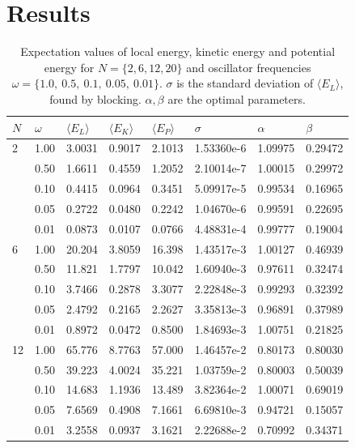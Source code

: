 \documentclass[english, a4paper]{article}
\newcommand\bk[1]{\langle#1\rangle}
\begin{document}
	
	
	
	\section{Results}
	
		\begin{table}[H]
			\begin{center}
				\caption{Expectation values of local energy, kinetic energy and potential energy for $N=\{2,6,12,20\}$ and oscillator frequencies $\omega = \{1.0,\:0.5,\:0.1,\:0.05,\:0.01\}$. $\sigma$ is the standard deviation of $\langle E_L\rangle$, found by blocking. $\alpha,\beta$ are the optimal parameters.}
				\begin{tabularx}{\textwidth}{@{}YYYYYYYY@{}}
					$N$	& $\omega$ & $\bk{E_L}$ & $\bk{E_K}$ & $\bk{E_P}$ & $\sigma$ & $\alpha$ & $\beta$\\
						&	1.00 & 3.0031 & 0.9017 & 2.1013 & 1.53360e-6 & 1.09975 & 0.29472 \\
					&	0.50 & 1.6611 & 0.4559 & 1.2052 & 2.10014e-7 & 1.00015 & 0.29972 \\
					&	0.10 & 0.4415 & 0.0964 & 0.3451 & 5.09917e-5 & 0.99534 & 0.16965 \\
					&	0.05 & 0.2722 & 0.0480 & 0.2242 & 1.04670e-6 & 0.99591 & 0.22695 \\
					&   0.01 & 0.0873 & 0.0107 & 0.0766 & 4.48831e-4 & 0.99777 & 0.19004 \\
					   &	1.00 & 20.204 & 3.8059 & 16.398 & 1.43517e-3 & 1.00127 & 0.46939 \\
					&	0.50 & 11.821 & 1.7797 & 10.042 & 1.60940e-3 & 0.97611 & 0.32474 \\
					&	0.10 & 3.7466 & 0.2878 & 3.3077 & 2.22848e-3 & 0.99293 & 0.32392 \\
					&	0.05 & 2.4792 & 0.2165 & 2.2627 & 3.35813e-3 & 0.96891 & 0.37989 \\
					&   0.01 & 0.8972 & 0.0472 & 0.8500 & 1.84693e-3 & 1.00751 & 0.21825 \\
					  &	1.00 & 65.776 & 8.7763 & 57.000 & 1.46457e-2 & 0.80173 & 0.80030 \\
					&	0.50 & 39.223 & 4.0024 & 35.221 & 1.03759e-2 & 0.80003 & 0.50039 \\
					&	0.10 & 14.683 & 1.1936 & 13.489 & 3.82364e-2 & 1.00071 & 0.69019 \\
					&	0.05 & 7.6569 & 0.4908 & 7.1661 & 6.69810e-3 & 0.94721 & 0.15057 \\
					&   0.01 & 3.2558 & 0.0937 & 3.1621 & 2.22688e-2 & 0.70992 & 0.34371 \\

\end{tabularx}
\end{center}
\end{table}
\end{document}
